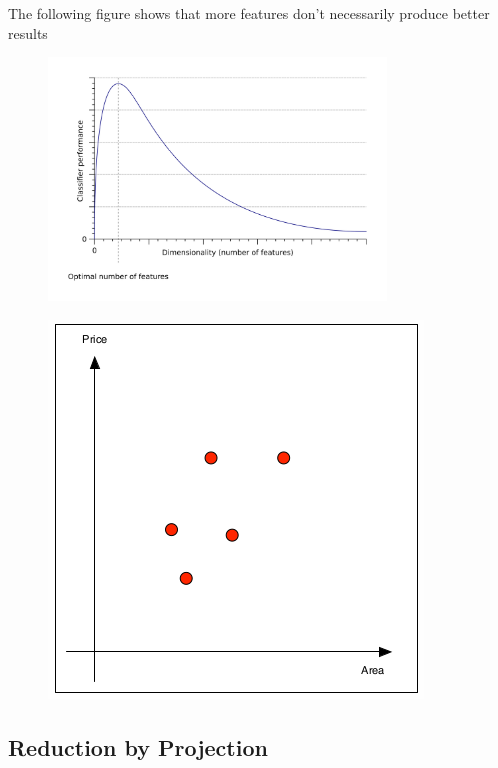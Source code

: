 \documentclass[11pt]{article}
\begin{document}
The following figure shows that more features don't necessarily produce better results

\begin{figure}[htb!]
    \centering
    \includegraphics[keepaspectratio, width=0.8\textwidth]{dimensionality_reduction.png}
\end{figure}

\clearpage

\vspace{10px}

\begin{figure}
    \centering
    \includegraphics[keepaspectratio,height=14\baselineskip]{data_points_2d}
\end{figure}

\subsection{Reduction by Projection}
\end{document}
